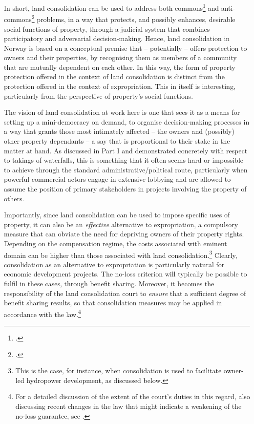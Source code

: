 In short, land consolidation can be used to address both commons\footcite{hardin68} and anti-commons\footcite{heller98} problems, in a way that protects, and possibly enhances, desirable social functions of property, through a judicial system that combines participatory and adversarial decision-making. Hence, land consolidation in Norway is based on a conceptual premise that -- potentially -- offers protection to owners and their properties, by recognising them as members of a community that are mutually dependent on each other. In this way, the form of property protection offered in the context of land consolidation is distinct from the protection offered in the context of expropriation. This in itself is interesting, particularly from the perspective of property's social functions.

The vision of land consolidation at work here is one that sees it as a means for setting up a mini-democracy on demand, to organise decision-making processes in a way that grants those most intimately affected -- the owners and (possibly) other property dependants -- a say that is proportional to their stake in the matter at hand. As discussed in Part I and demonstrated concretely with respect to takings of waterfalls, this is something that it often seems hard or impossible to achieve through the standard administrative/political route, particularly when powerful commercial actors engage in extensive lobbying and are allowed to assume the position of primary stakeholders in projects involving the property of others.

Importantly, since land consolidation can be used to impose specific uses of property, it can also be an {\it effective} alternative to expropriation, a compulsory measure that can obviate the need for depriving owners of their property rights. Depending on the compensation regime, the costs associated with eminent domain can be higher than those associated with land consolidation.\footnote{This is the case, for instance, when consolidation is used to facilitate owner-led hydropower development, as discussed below.} Clearly, consolidation as an alternative to expropriation is particularly natural for economic development projects. The no-loss criterion will typically be possible to fulfil in these cases, through benefit sharing. Moreover, it becomes the responsibility of the land consolidation court to {\it ensure} that a sufficient degree of benefit sharing results, so that consolidation measures may be applied in accordance with the law.\footnote{For a detailed discussion of the extent of the court's duties in this regard, also discussing recent changes in the law that might indicate a weakening of the no-loss guarantee, see \cite{hauge15}.}

